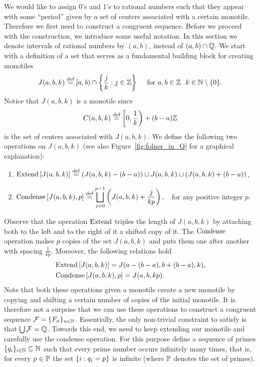 We would like to assign $0$'s and $1$'s to rational numbers such that they appear with some ``period'' given by a set of centers associated with a certain monotile.
%
Therefore we first need to construct a congruent \Folner sequence. 
%
Before we proceed with the construction, we introduce some useful notation.  
In this section we  denote intervals of rational numbers by $(a,b)$, instead of $(a,b) \cap \mathbb{Q}$. 
We start with a definition of a set that serves as a fundamental building block for creating monotiles
\[
J(a,b,k)\stackrel{\textup{def}}{=} [a,b)\cap\left\{\frac{j}{k}:j\in\mathbb{Z} \right\}\quad \text{ for } a,b\in\mathbb{Z}~~k\in\mathbb{N}\setminus\{0\}.
\]
Notice that $J(a,b,k)$ is a monotile since 
\begin{equation*}\label{eq:defCabk}
C(a,b,k)\stackrel{\textup{def}}{=}\left[0,\frac{1}{k}\right)+(b-a)\mathbb{Z}
\end{equation*}
is the set of centers associated with $J(a,b,k)$. We define the following two operations on $J(a,b,k)$ (see also Figure~\ref{fig:folner_in_Q} for a graphical explanation):
\begin{enumerate}
\item $\operatorname{Extend} \left[J(a,b,k)\right]\stackrel{\textup{def}}{=} (J(a,b,k)-(b-a))\sqcup J(a,b,k)\sqcup (J(a,b,k)+(b-a)) $,
\item  $\displaystyle \operatorname{Condense} \left[J(a,b,k),p\right]\stackrel{\textup{def}}{=} \bigsqcup_{j=0}^{p-1}\left(J(a,b,k)+\frac{j}{kp}\right), ~~$ for any positive integer $p$.
\end{enumerate}
%
Observe that the operation $\operatorname{Extend}$ triples the length of $J(a,b,k)$ by attaching both to the left and to the right of it a shifted copy of it. The $\operatorname{Condense}$ operation makes $p$ copies of the set $J(a,b,k)$ and puts them one after another with spacing $\frac{1}{kp}$.
%
Moreover, the following relations hold
\begin{align*}
&\operatorname{Extend} \left[ J(a,b,k)\right] = J(a-(b-a), b+(b-a),k), \\
&\operatorname{Condense} \left[ J(a,b,k),p\right]=J(a,b,kp).
\end{align*}
%
Note that both these operations given a monotile create a new monotile by copying and shifting a certain number of copies of the initial monotile.
% 
It is therefore not a surprise that we can use these operations to construct a congruent \Folner sequence $\operatorname{\mathcal{F}}=\{F_n\}_{n\in\mathbb{N}}$.
%
Essentially, the only non-trivial constraint to satisfy is that $\bigcup\operatorname{\mathcal{F}}=\mathbb{Q}$.
%
Towards this end, we need to keep extending our monotile and carefully use the condense operation.
%
For this purpose define a sequence of primes $\{q_i\}_{i\in\mathbb{N}}\subseteq\mathbb{N}$  such that every prime number occurs infinitely many times, that is,  for every $p\in\mathbb{P}$ the set $\left\{i:q_i=p\right\}$ is infinite (where $\mathbb{P}$ denotes the set of primes). 

